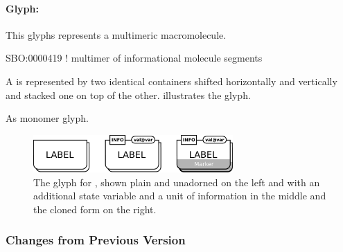 \paragraph{Glyph: }

This glyphs represents a multimeric macromolecule.

\begin{glyphDescription}

\glyphSboTerm SBO:0000419 ! multimer of informational molecule segments 

\glyphContainer A  is represented by two identical containers shifted horizontally and vertically and stacked one on top of the other.   illustrates the glyph.

\glyphLabel As monomer glyph.




\end{glyphDescription}

\begin{figure}[H]
  \centering
  \includegraphics[width = 3in]{images/geneticMultimer}
  \caption{The \PD glyph for , shown plain and
    unadorned on the left and with an additional state variable and a
    unit of information in the middle and the cloned form on the right.} 
  \label{fig:genetic-multimer}
\end{figure}

\subsubsection{Changes from Previous Version}

